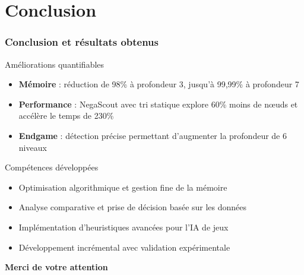 \documentclass{beamer}
\begin{document}
\section{Conclusion}

\begin{frame}
    \frametitle{Conclusion et résultats obtenus}
    
    \begin{block}{Améliorations quantifiables}
    \scriptsize
    \begin{itemize}
        \item \textbf{Mémoire} : réduction de 98\% à profondeur 3, jusqu'à 99,99\% à profondeur 7
        \item \textbf{Performance} : NegaScout avec tri statique explore 60\% moins de nœuds et accélère le temps de 230\%
        \item \textbf{Endgame} : détection précise permettant d'augmenter la profondeur de 6 niveaux
    \end{itemize}
    \end{block}
    
    \begin{block}{Compétences développées}
    \scriptsize
    \begin{itemize}
        \item Optimisation algorithmique et gestion fine de la mémoire
        \item Analyse comparative et prise de décision basée sur les données
        \item Implémentation d'heuristiques avancées pour l'IA de jeux
        \item Développement incrémental avec validation expérimentale
    \end{itemize}
    \end{block}
    
    \begin{center}
        \large\textbf{Merci de votre attention}
    \end{center}
\end{frame}
\end{document}
